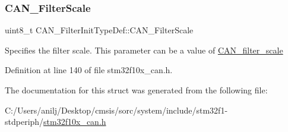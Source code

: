 \subsubsection{\texorpdfstring{C\+A\+N\+\_\+\+Filter\+Scale}{CAN\_FilterScale}}
{\footnotesize\ttfamily uint8\+\_\+t C\+A\+N\+\_\+\+Filter\+Init\+Type\+Def\+::\+C\+A\+N\+\_\+\+Filter\+Scale}

Specifies the filter scale. This parameter can be a value of \hyperlink{group___c_a_n__filter__scale}{C\+A\+N\+\_\+filter\+\_\+scale} 

Definition at line 140 of file stm32f10x\+\_\+can.\+h.



The documentation for this struct was generated from the following file\+:\begin{DoxyCompactItemize}
\item 
C\+:/\+Users/anilj/\+Desktop/cmsis/sorc/system/include/stm32f1-\/stdperiph/\hyperlink{stm32f10x__can_8h}{stm32f10x\+\_\+can.\+h}\end{DoxyCompactItemize}
